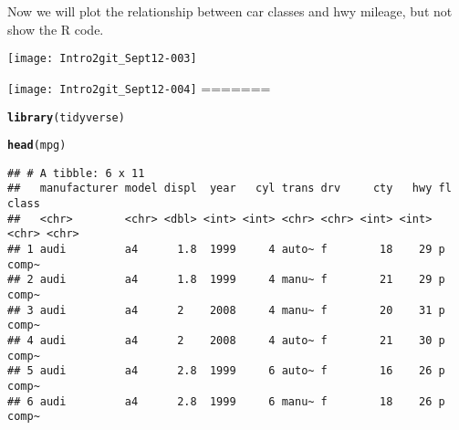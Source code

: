 \documentclass{article}
\makeatletter
\newcommand{\hlstd}[1]{\textcolor[rgb]{0.345,0.345,0.345}{#1}}%
\newcommand{\hlkwd}[1]{\textcolor[rgb]{0.737,0.353,0.396}{\textbf{#1}}}%
\newenvironment{kframe}{%
 \def\at@end@of@kframe{}%
 \ifinner\ifhmode%
  \def\at@end@of@kframe{\end{minipage}}%
  \begin{minipage}{\columnwidth}%
 \fi\fi%
 \def\FrameCommand##1{\hskip\@totalleftmargin \hskip-\fboxsep
 \colorbox{shadecolor}{##1}\hskip-\fboxsep
     \hskip-\linewidth \hskip-\@totalleftmargin \hskip\columnwidth}%
 \MakeFramed {\advance\hsize-\width
   \@totalleftmargin\z@ \linewidth\hsize
   \@setminipage}}%
 {\par\unskip\endMakeFramed%
 \at@end@of@kframe}
\newenvironment{knitrout}{}{} %
\makeatother
\begin{document}
Now we will plot the relationship between car classes and hwy mileage, but not show the R code.

\texttt{[image: Intro2git\_Sept12-003]}

\texttt{[image: Intro2git\_Sept12-004]}
=======
\begin{knitrout}
\color{fgcolor}\begin{kframe}
\begin{alltt}
\hlkwd{library}\hlstd{(tidyverse)}
\end{alltt}


{\ttfamily\noindent\itshape\color{messagecolor}{\#\# -- Attaching packages ---------------------------------- tidyverse 1.2.1 --}}

{\ttfamily\noindent\itshape\color{messagecolor}{\#\# √ ggplot2 3.0.0\ \ \ \  √ purrr\ \  0.2.5\\\#\# √ tibble\ \ 1.4.2\ \ \ \  √ dplyr\ \  0.7.6\\\#\# √ tidyr\ \  0.8.1\ \ \ \  √ stringr 1.3.1\\\#\# √ readr\ \  1.1.1\ \ \ \  √ forcats 0.3.0}}

{\ttfamily\noindent\itshape\color{messagecolor}{\#\# -- Conflicts ------------------------------------- tidyverse\_conflicts() --\\\#\# x dplyr::filter() masks stats::filter()\\\#\# x dplyr::lag()\ \ \ \ masks stats::lag()}}\begin{alltt}
\hlkwd{head}\hlstd{(mpg)}
\end{alltt}
\begin{verbatim}
## # A tibble: 6 x 11
##   manufacturer model displ  year   cyl trans drv     cty   hwy fl    class
##   <chr>        <chr> <dbl> <int> <int> <chr> <chr> <int> <int> <chr> <chr>
## 1 audi         a4      1.8  1999     4 auto~ f        18    29 p     comp~
## 2 audi         a4      1.8  1999     4 manu~ f        21    29 p     comp~
## 3 audi         a4      2    2008     4 manu~ f        20    31 p     comp~
## 4 audi         a4      2    2008     4 auto~ f        21    30 p     comp~
## 5 audi         a4      2.8  1999     6 auto~ f        16    26 p     comp~
## 6 audi         a4      2.8  1999     6 manu~ f        18    26 p     comp~
\end{verbatim}
\end{kframe}
\end{knitrout}
\end{document}
